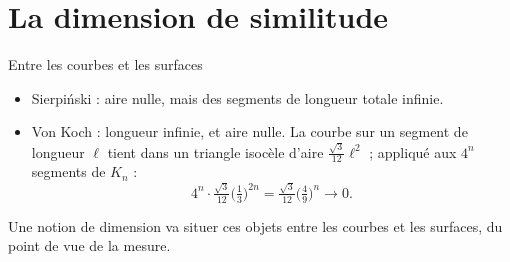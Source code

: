 \section{La dimension de similitude}

\begin{frame}{Entre les courbes et les surfaces}
  \small
  \begin{itemize}
    \item Sierpiński : aire nulle, mais des segments de longueur totale
      infinie.
    \item Von Koch : longueur infinie, et aire nulle. La courbe sur un
      segment de longueur $\ell$ tient dans un triangle isocèle d'aire
      $\tfrac{\sqrt3}{12}\ell^2$ ; appliqué aux $4^n$ segments de $K_n$ :
      \[
        4^n\cdot\tfrac{\sqrt3}{12}\big(\tfrac13\big)^{2n}
        = \tfrac{\sqrt3}{12}\big(\tfrac49\big)^n \to 0.
      \]
  \end{itemize}
  \vspace{4pt}
  Une notion de dimension va situer ces objets entre les courbes et les
  surfaces, du point de vue de la mesure.
\end{frame}

